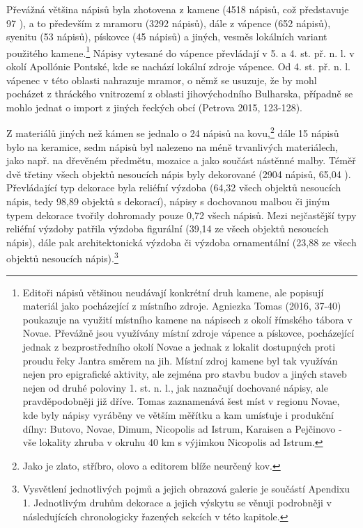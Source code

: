 Převážná většina nápisů byla zhotovena z kamene (4518 nápisů, což představuje 97 ), a to především z mramoru (3292 nápisů), dále z vápence (652 nápisů), syenitu (53 nápisů), pískovce (45 nápisů) a jiných, vesměs lokálních variant použitého kamene.\footnote{Editoři nápisů většinou neudávají konkrétní druh kamene, ale popisují materiál jako pocházející z místního zdroje. Agniezka Tomas (2016, 37-40) poukazuje na využití místního kamene na nápisech z okolí římského tábora v Novae. Převážně jsou využívány místní zdroje vápence a pískovce, pocházející jednak z bezprostředního okolí Novae a jednak z lokalit dostupných proti proudu řeky Jantra směrem na jih. Místní zdroj kamene byl tak využíván nejen pro epigrafické aktivity, ale zejména pro stavbu budov a jiných staveb nejen od druhé poloviny 1. st. n. l., jak naznačují dochované nápisy, ale pravděpodobněji již dříve. Tomas zaznamenává šest míst v regionu Novae, kde byly nápisy vyráběny ve větším měřítku a kam umísťuje i produkční dílny: Butovo, Novae, Dimum, Nicopolis ad Istrum, Karaisen a Pejčinovo - vše lokality zhruba v okruhu 40 km s výjimkou Nicopolis ad Istrum.} Nápisy vytesané do vápence převládají v 5. a 4. st. př. n. l. v okolí Apollónie Pontské, kde se nachází lokální zdroje vápence. Od 4. st. př. n. l. vápenec v této oblasti nahrazuje mramor, o němž se usuzuje, že by mohl pocházet z thráckého vnitrozemí z oblasti jihovýchodního Bulharska, případně se mohlo jednat o import z jiných řeckých obcí (Petrova 2015, 123-128).

Z materiálů jiných než kámen se jednalo o 24 nápisů na kovu,\footnote{Jako je zlato, stříbro, olovo a editorem blíže neurčený kov.} dále 15 nápisů bylo na keramice, sedm nápisů byl nalezeno na méně trvanlivých materiálech, jako např. na dřevěném předmětu, mozaice a jako součást nástěnné malby. Téměř dvě třetiny všech objektů nesoucích nápis byly dekorované (2904 nápisů, 65,04 ). Převládající typ dekorace byla reliéfní výzdoba (64,32  všech objektů nesoucích nápis, tedy 98,89  objektů s dekorací), nápisy s dochovanou malbou či jiným typem dekorace tvořily dohromady pouze 0,72  všech nápisů. Mezi nejčastější typy reliéfní výzdoby patřila výzdoba figurální (39,14  ze všech objektů nesoucích nápis), dále pak architektonická výzdoba či výzdoba ornamentální (23,88  ze všech objektů nesoucích nápis).\footnote{Vysvětlení jednotlivých pojmů a jejich obrazová galerie je součástí Apendixu 1. Jednotlivým druhům dekorace a jejich výskytu se věnuji podrobněji v následujících chronologicky řazených sekcích v této kapitole.}

